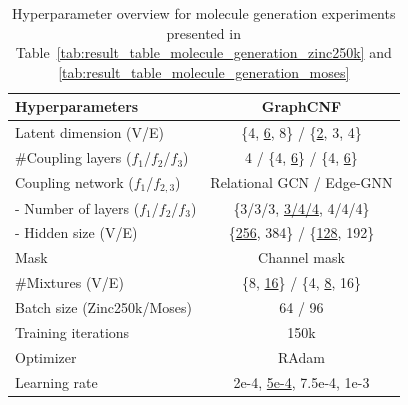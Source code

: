 \begin{table}[ht!]
    \centering
    \caption[Hyperparameter overview for the molecule generation experiments]{Hyperparameter overview for molecule generation experiments presented in Table~\ref{tab:result_table_molecule_generation_zinc250k} and \ref{tab:result_table_molecule_generation_moses}}
    \label{tab:appendix_hyperparameters_molecule_generation}
    \renewcommand{\arraystretch}{1.2}
    \begin{tabular}{lc}
        \toprule
        \textbf{Hyperparameters} & \textbf{GraphCNF}\\
        \midrule
        Latent dimension (V/E) & \{4, \underline{6}, 8\} / \{\underline{2}, 3, 4\}\\
        \#Coupling layers ($f_1$/$f_2$/$f_3$) & 4 / \{4, \underline{6}\} / \{4, \underline{6}\} \\
        Coupling network ($f_1$/$f_{2,3}$) & Relational GCN / Edge-GNN\\
        - Number of layers ($f_1$/$f_2$/$f_3$) & \{3/3/3, \underline{3/4/4}, 4/4/4\}\\
        - Hidden size (V/E) & \{\underline{256}, 384\} / \{\underline{128}, 192\} \\
        Mask & Channel mask\\
        \#Mixtures (V/E) & \{8, \underline{16}\} / \{4, \underline{8}, 16\}\\
        Batch size (Zinc250k/Moses) & 64 / 96\\
        Training iterations & 150k\\
        Optimizer & RAdam \cite{RAdam}\\
        Learning rate & {2e-4, \underline{5e-4}, 7.5e-4, 1e-3}\\
        \bottomrule
    \end{tabular}
\end{table}

